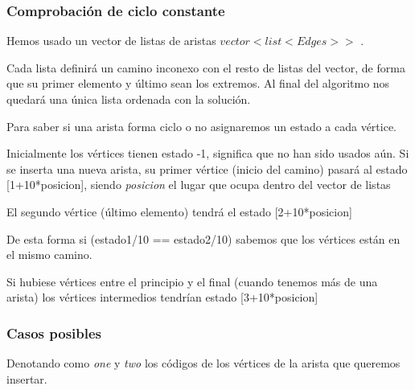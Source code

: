 \subsubsection{Comprobación de ciclo constante}
\begin{frame}
	\begin{block}{ }
	Hemos usado un vector de listas de aristas $vector < list <Edges> >$ .

	Cada lista definirá un camino inconexo con el resto de listas del vector, de forma que 
	su primer elemento y último sean los extremos.
	Al final del algoritmo nos quedará una única lista ordenada con la solución.
	\end{block}
		
	\begin{alertblock}{ }
	Para saber si una arista forma ciclo o no asignaremos un estado a cada vértice.
	\end{alertblock}
	
\end{frame}

\begin{frame}
	\begin{block}{ }
	Inicialmente los vértices tienen estado -1, significa que no han sido usados aún.
	Si se inserta una nueva arista, su primer vértice (inicio del camino) pasará al estado
	[1+10*posicion], siendo \textit{posicion} el lugar que ocupa dentro del vector de
	listas 
	
	El segundo vértice (último elemento) tendrá el estado [2+10*posicion]

	De esta forma si (estado1/10 == estado2/10) sabemos que los vértices están en el mismo 
	camino.
	\end{block}
	
	\begin{block}{ }
	Si hubiese vértices entre el principio y el final (cuando tenemos más de una arista) 
	los vértices intermedios tendrían estado [3+10*posicion]
	\end{block}
\end{frame}


\subsubsection{Casos posibles}
\begin{frame}
	\begin{block}
	Denotando como \textit{one} y \textit{two} los códigos de los vértices de la arista 
	que queremos insertar.
	\end{block}
\end{frame}
	
